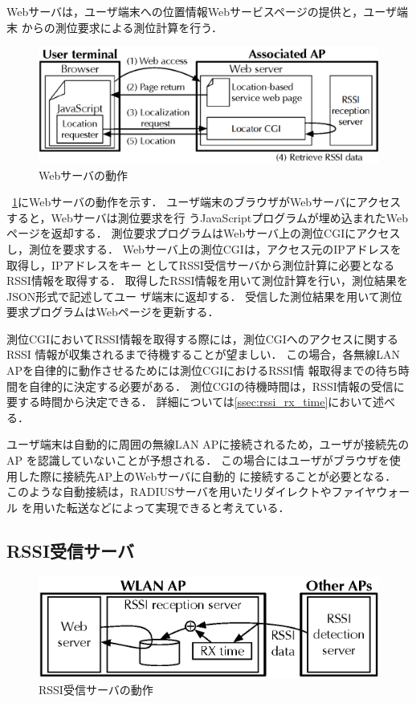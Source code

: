 \documentclass[technicalreport]{ieicej}
\begin{document}
Webサーバは，ユーザ端末への位置情報Webサービスページの提供と，ユーザ端末
からの測位要求による測位計算を行う．

\begin{figure}[bt]
 \centering
 \includegraphics[width=\columnwidth]{figure/web_server.eps}
 \caption{Webサーバの動作}
 \label{fig:web_server}
\end{figure}

\figurename~\ref{fig:web_server}にWebサーバの動作を示す．
ユーザ端末のブラウザがWebサーバにアクセスすると，Webサーバは測位要求を行
うJavaScriptプログラムが埋め込まれたWebページを返却する．
測位要求プログラムはWebサーバ上の測位CGIにアクセスし，測位を要求する．
Webサーバ上の測位CGIは，アクセス元のIPアドレスを取得し，IPアドレスをキー
としてRSSI受信サーバから測位計算に必要となるRSSI情報を取得する．
取得したRSSI情報を用いて測位計算を行い，測位結果をJSON形式で記述してユー
ザ端末に返却する．
受信した測位結果を用いて測位要求プログラムはWebページを更新する．

測位CGIにおいてRSSI情報を取得する際には，測位CGIへのアクセスに関するRSSI
情報が収集されるまで待機することが望ましい．
この場合，各無線LAN APを自律的に動作させるためには測位CGIにおけるRSSI情
報取得までの待ち時間を自律的に決定する必要がある．
測位CGIの待機時間は，RSSI情報の受信に要する時間から決定できる．
詳細については\ref{ssec:rssi_rx_time}において述べる．


ユーザ端末は自動的に周囲の無線LAN APに接続されるため，ユーザが接続先のAP
を認識していないことが予想される．
この場合にはユーザがブラウザを使用した際に接続先AP上のWebサーバに自動的
に接続することが必要となる．
このような自動接続は，RADIUSサーバを用いたリダイレクトやファイヤウォール
を用いた転送などによって実現できると考えている．

\subsection{RSSI受信サーバ}

\begin{figure}[bt]
 \centering
 \includegraphics[width=0.8\columnwidth]{figure/rssi_rx_server.eps}
 \caption{RSSI受信サーバの動作}
 \label{fig:rssi_rx_server}
\end{figure}
\end{document}
